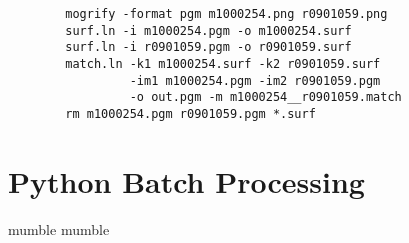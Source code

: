 \begin{verbatim}
        mogrify -format pgm m1000254.png r0901059.png
        surf.ln -i m1000254.pgm -o m1000254.surf
        surf.ln -i r0901059.pgm -o r0901059.surf
        match.ln -k1 m1000254.surf -k2 r0901059.surf
                 -im1 m1000254.pgm -im2 r0901059.pgm
                 -o out.pgm -m m1000254__r0901059.match
        rm m1000254.pgm r0901059.pgm *.surf
\end{verbatim}

\begin{center}
\end{center}


\chapter{Python Batch Processing}

mumble mumble

